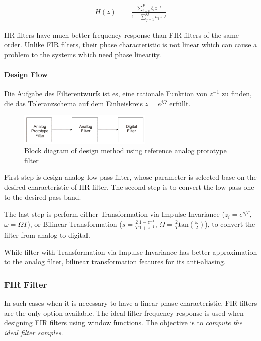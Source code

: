 \begin{align*}
H(z) & = \frac{\sum_{i=0}^P b_{i} z^{-i}}{1+\sum_{j=1}^Q a_{j} z^{-j}}
\end{align*}

IIR filters have much better frequency response than FIR filters of the same order. Unlike FIR filters, their phase characteristic is not linear which can cause a problem to the systems which need phase linearity.

\paragraph{Design Flow}

Die Aufgabe des Filterentwurfs ist es, eine rationale Funktion von $z^{-1}$ zu finden, die das Toleranzschema auf dem Einheiskreis $z=e^{j\Omega}$ erf\"ullt.

\begin{figure}
  \centering
  \includegraphics[width=2.5in]{fig/fig3-1-2.png}
  \caption{Block diagram of design method using reference analog prototype filter}\label{fig_iir}
\end{figure}

First step is design analog low-pass filter, whose parameter is selected base on the desired characteristic of IIR filter. The second step is to convert the low-pass one to the desired pass band.

The last step is perform either Transformation via Impulse Invariance ($z_i=e^{s_iT}$, $\omega = \Omega T$), or Bilinear Transformation ($s=\frac{2}{T}\frac{1-z^{-1}}{1+z^{-1}}$, $\Omega = \frac{2}{T}\textrm{tan}(\frac{\omega}{2})$), to convert the filter from analog to digital.

While filter with Transformation via Impulse Invariance has better approximation to the analog filter, bilinear transformation features for its anti-aliasing.

\subsubsection{FIR Filter}
In such cases when it is necessary to have a linear phase characteristic, FIR filters are the only option available. The ideal filter frequency response is used when designing FIR filters using window functions. The objective is to \emph{compute the ideal filter samples}.

